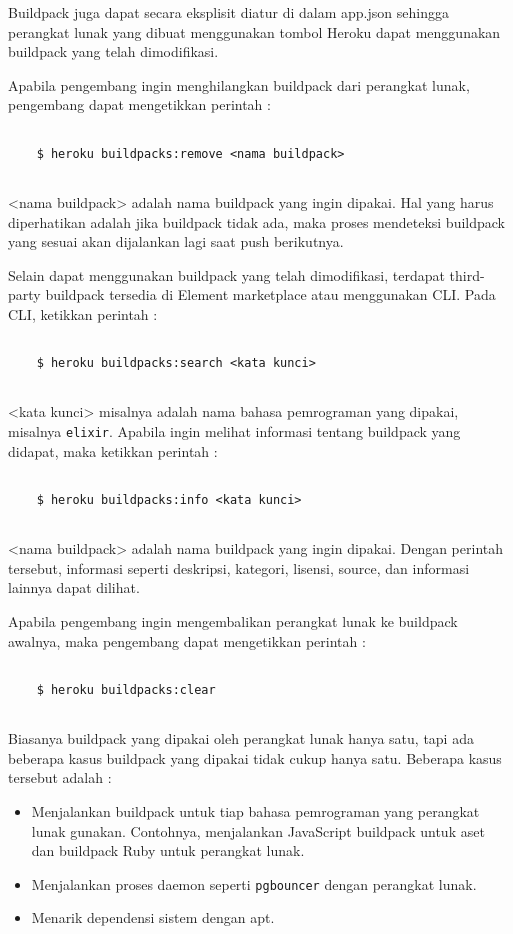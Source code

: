 Buildpack juga dapat secara eksplisit diatur di dalam app.json sehingga perangkat lunak yang dibuat menggunakan tombol Heroku dapat menggunakan buildpack yang telah dimodifikasi.

Apabila pengembang ingin menghilangkan buildpack dari perangkat lunak, pengembang dapat mengetikkan perintah :
\begin{lstlisting}

	$ heroku buildpacks:remove <nama buildpack>
	
\end{lstlisting}
<nama buildpack> adalah nama buildpack yang ingin dipakai. Hal yang harus diperhatikan adalah jika buildpack tidak ada, maka proses mendeteksi buildpack yang sesuai akan dijalankan lagi saat push berikutnya.

Selain dapat menggunakan buildpack yang telah dimodifikasi, terdapat third-party buildpack tersedia di Element marketplace atau menggunakan CLI. Pada CLI, ketikkan perintah :
\begin{lstlisting}

	$ heroku buildpacks:search <kata kunci>
	
\end{lstlisting}
<kata kunci> misalnya adalah nama bahasa pemrograman yang dipakai, misalnya \texttt{elixir}. Apabila ingin melihat informasi tentang buildpack yang didapat, maka ketikkan perintah :
\begin{lstlisting}

	$ heroku buildpacks:info <kata kunci>
	
\end{lstlisting}
<nama buildpack> adalah nama buildpack yang ingin dipakai. Dengan perintah tersebut, informasi seperti deskripsi, kategori, lisensi, source, dan informasi lainnya dapat dilihat.

Apabila pengembang ingin mengembalikan perangkat lunak ke buildpack awalnya, maka pengembang dapat mengetikkan perintah :
\begin{lstlisting}

	$ heroku buildpacks:clear
	
\end{lstlisting}

Biasanya buildpack yang dipakai oleh perangkat lunak hanya satu, tapi ada beberapa kasus buildpack yang dipakai tidak cukup hanya satu. Beberapa kasus tersebut adalah :
\begin{itemize}
\item Menjalankan buildpack untuk tiap bahasa pemrograman yang perangkat lunak gunakan. Contohnya, menjalankan JavaScript buildpack untuk aset dan buildpack Ruby untuk perangkat lunak.
\item Menjalankan proses daemon seperti \texttt{pgbouncer} dengan perangkat lunak.
\item Menarik dependensi sistem dengan apt.
\end{itemize}

